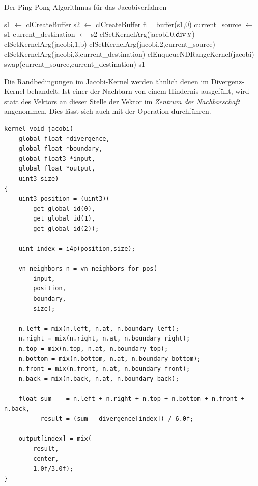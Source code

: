 \begin{algorithm}
\caption{Der Ping-Pong-Algorithmus für das Jacobiverfahren}
\label{alg:implementation_wind_ping_ping}
\begin{algorithmic}
	\State s1 $\gets$ clCreateBuffer
	\State s2 $\gets$ clCreateBuffer
        \State fill\_buffer(s1,0)
        \State current\_source $\gets$ s1
        \State current\_destination $\gets$ s2
        \State clSetKernelArg(jacobi,0,$\operatorname*{div} u$)
        \State clSetKernelArg(jacobi,1,b)
            \State clSetKernelArg(jacobi,2,current\_source)
            \State clSetKernelArg(jacobi,3,current\_destination)
            \State clEnqueueNDRangeKernel(jacobi)
            \State swap(current\_source,current\_destination)
        \EndFor
        \State \Return s1
\EndFunction
\end{algorithmic}
\end{algorithm}

Die Randbedingungen im Jacobi-Kernel werden ähnlich denen im
Divergenz-Kernel behandelt. Ist einer der Nachbarn von einem Hindernis
ausgefüllt, wird statt des Vektors an dieser Stelle der Vektor im
\emph{Zentrum der Nachbarschaft} angenommen. Dies lässt sich auch mit
der Operation  durchführen.

\begin{verbatim}
kernel void jacobi(
    global float *divergence,
    global float *boundary,
    global float3 *input,
    global float *output,
    uint3 size)
{
    uint3 position = (uint3)(
        get_global_id(0),
        get_global_id(1),
        get_global_id(2));

    uint index = i4p(position,size);

    vn_neighbors n = vn_neighbors_for_pos(
        input,
        position,
        boundary,
        size);

    n.left = mix(n.left, n.at, n.boundary_left);
    n.right = mix(n.right, n.at, n.boundary_right);
    n.top = mix(n.top, n.at, n.boundary_top);
    n.bottom = mix(n.bottom, n.at, n.boundary_bottom);
    n.front = mix(n.front, n.at, n.boundary_front);
    n.back = mix(n.back, n.at, n.boundary_back);

    float sum    = n.left + n.right + n.top + n.bottom + n.front + n.back,
          result = (sum - divergence[index]) / 6.0f;

    output[index] = mix(
        result,
        center,
        1.0f/3.0f);
}

\end{verbatim}

